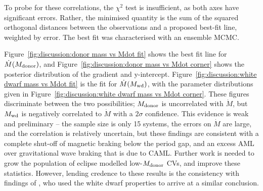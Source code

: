 To probe for these correlations, the $\chi^2$ test is insufficient, as both axes have significant errors.
Rather, the minimised quantity is the sum of the squared orthogonal distances between the observations and a proposed best-fit line, weighted by error. The best fit was characterised with an ensemble MCMC.

Figure~\ref{fig:discussion:donor mass vs Mdot fit} shows the best fit line for $\dot M(M_{\rm donor})$, and Figure~\ref{fig:discussion:donor mass vs Mdot corner} shows the posterior distribution of the gradient and y-intercept. Figure~\ref{fig:discussion:white dwarf mass vs Mdot fit} is the fit for $\dot M(M_{\rm wd})$, with the parameter distributions given in Figure~\ref{fig:discussion:white dwarf mass vs Mdot corner}.
These figures discriminate between the two possibilities; $M_{\rm donor}$ is uncorrelated with $\dot M$, but $M_{\rm wd}$ is negatively correlated to $\dot M$ with a $2\sigma$ confidence.
This evidence is weak and preliminary -- the sample size is only 15 systems, the errors on $\dot M$ are large, and the correlation is relatively uncertain, but these findings are consistent with a complete shut-off of magnetic braking below the period gap, and an excess AML over gravitational wave braking that is due to CAML. Further work is needed to grow the population of eclipse modelled low-$M_{\rm donor}$ CVs, and improve these statistics.
However, lending credence to these results is the consistency with findings of \citet{Pala2021}, who used the white dwarf properties to arrive at a similar conclusion.


